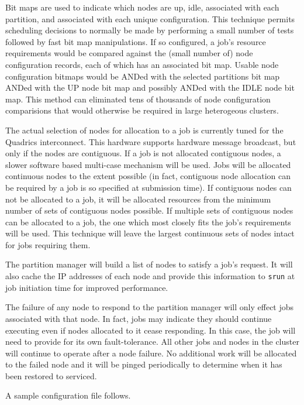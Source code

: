 Bit maps are used to indicate which nodes are up, idle, associated
with each partition, and associated with each unique configuration.
This technique permits scheduling decisions to normally be made by
performing a small number of tests followed by fast bit map manipulations. 
If so configured, a job's resource requirements would be compared 
against the (small number of) node configuration records, each of 
which has an associated bit map. Usable node configuration bitmaps 
would be ANDed with the selected partitions bit map ANDed with the 
UP node bit map and possibly ANDed with the IDLE node bit map. 
This method can eliminated tens of thousands of node configuration 
comparisions that would otherwise be required in large heterogeous 
clusters.

The actual selection of nodes for allocation to a job is currently
tuned for the Quadrics interconnect.  This hardware supports hardware
message broadcast, but only if the nodes are contiguous.  If a job
is not allocated contiguous nodes, a slower software based multi-case
mechanism will be used.  Jobs will be allocated continuous nodes to the
extent possible (in fact, contiguous node allocation can be required
by a job is so specified at submission time).  If contiguous nodes
can not be allocated to a job, it will be allocated resources from
the minimum number of sets of contiguous nodes possible.  If multiple
sets of contiguous nodes can be allocated to a job, the one which most
closely fits the job's requirements will be used.  This technique will
leave the largest continuous sets of nodes intact for jobs requiring them.

The partition manager will build a list of nodes to satisfy a job's
request.  It will also cache the IP addresses of
each node and provide this information to {\tt srun} at job initiation
time for improved performance.

The failure of any node to respond to the partition manager will only
effect jobs associated with that node.  In fact, jobs may indicate they
should continue executing even if nodes allocated to it cease responding.
In this case, the job will need to provide for its own fault-tolerance.
All other jobs and nodes in the cluster will continue to operate after
a node failure.  No additional work will be allocated to the failed
node and it will be pinged periodically to determine when it has been
restored to serviced.

A sample configuration file follows.

